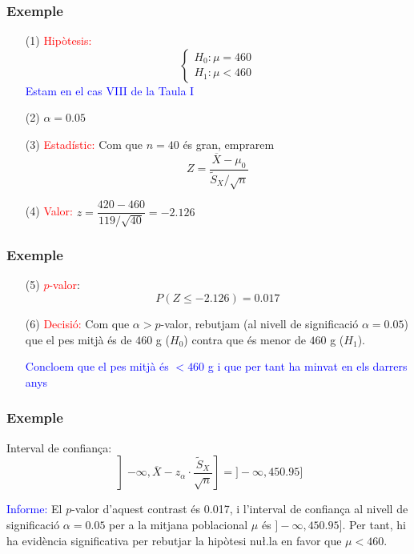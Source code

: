 \documentclass[12pt,t]{beamer}\usepackage[]{graphicx}\usepackage[]{color}
\newcommand{\red}[1]{\textcolor{red}{#1}}
\newcommand{\blue}[1]{\textcolor{blue}{#1}}
\renewcommand{\emph}[1]{{\color{red}#1}}
\renewcommand{\leq}{\leqslant}
\theoremstyle{plain}
\theoremstyle{definition}
\begin{document}
\begin{frame}
\frametitle{Exemple}

\begin{itemize}
\item [(1)] \red{Hipòtesis:}
$$\left\{\begin{array}{l}
H_{0}:\mu=460\\
H_{1}:\mu<460
\end{array}
\right.$$
\blue{Estam en el cas VIII de la Taula I}\pause

\item[(2)] $\alpha=0.05$
\pause

\item[(3)]  \red{Estadístic:} Com que $n=40$ és  gran, emprarem
$$
Z=\frac{\overline{X}-\mu_0}{{\widetilde{S}_X}/{\sqrt{n}}}
$$
\pause

\item[(4)] \red{Valor:} 
$z=\dfrac{420-460}{{119}/{\sqrt{40}}}=
-2.126
$
\end{itemize}
\end{frame}



\begin{frame}
\frametitle{Exemple}

\begin{itemize}

\item[(5)]  \red{$p$-valor}:
$$
P(Z\leq -2.126)=0.017
$$
\pause\medskip



\item[(6)] \red{Decisió:} Com que $\alpha>p$-valor,  rebutjam (al nivell de significació $\alpha=0.05$) que el pes mitjà és de $460$ g ($H_0$) contra que és
menor de $460$ g  ($H_{1}$).
\medskip

 \blue{Concloem que el pes mitjà és $<460$ g i que per tant ha minvat en els darrers anys}
\end{itemize}
\end{frame}



\begin{frame}
\frametitle{Exemple}


\emph{Interval de confiança}:
$$
\left]-\infty, \overline{X}-z_{\alpha}\cdot \frac{\widetilde{S}_X}{\sqrt{n}}\right]=]-\infty,450.95]
$$
\bigskip

\blue{Informe:} El $p$-valor d'aquest contrast és 0.017, i l'interval de confiança al nivell de significació $\alpha=0.05$ per a la mitjana poblacional $\mu$ és $]-\infty,450.95]$. Per tant, hi ha evidència significativa per rebutjar  la hipòtesi nu\l.la en favor que $\mu<460$.

\end{frame}
\end{document}
